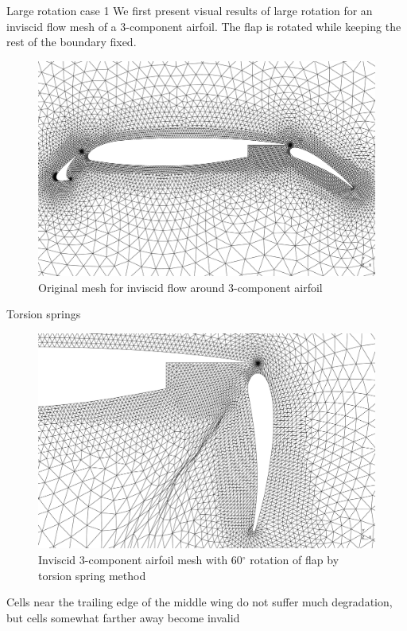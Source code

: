 \documentclass[t,12pt]{beamer}
\begin{document}
\begin{frame}{Large rotation case 1}
We first present visual results of large rotation for an inviscid flow mesh of a 3-component airfoil. The flap is rotated while keeping the rest of the boundary fixed.
\begin{figure}
	\centering
	\includegraphics[scale=0.16]{3comp-inviscid}
	\caption{Original mesh for inviscid flow around 3-component airfoil}
	\label{fig:wing-inviscid}
\end{figure}
\end{frame}

\begin{frame}{Torsion springs}
	\begin{figure}[!h]
		\centering
		\includegraphics[scale=0.17]{wing60-farhat}
		\caption{Inviscid 3-component airfoil mesh with 60$^\circ$ rotation of flap by torsion spring method}
		\label{fig:wing-inviscid-farhat}
	\end{figure}
	Cells near the trailing edge of the middle wing do not suffer much degradation, but cells somewhat farther away become invalid
\end{frame}
\end{document}
